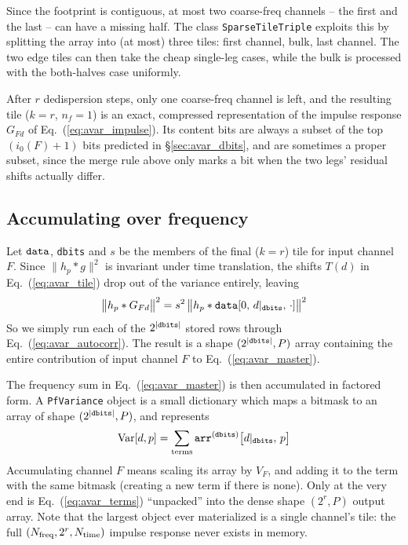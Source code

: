\documentclass{article}
\numberwithin{equation}{section}   %
\begin{document}
Since the footprint is contiguous, at most two coarse-freq channels -- the first and the last --
can have a missing half. The class \verb|SparseTileTriple| exploits this by splitting the array
into (at most) three tiles: first channel, bulk, last channel. The two edge tiles can then take
the cheap single-leg cases, while the bulk is processed with the both-halves case uniformly.

After $r$ dedispersion steps, only one coarse-freq channel is left, and the resulting tile
($k=r$, $n_f=1$) is an exact, compressed representation of the impulse response $G_{Fd}$ of
Eq.\ (\ref{eq:avar_impulse}). Its content bits are always a subset of the top $(i_0(F)+1)$ bits
predicted in \S\ref{sec:avar_dbits}, and are sometimes a proper subset, since the merge rule above
only marks a bit when the two legs' residual shifts actually differ.

\subsection{Accumulating over frequency}
\label{sec:avar_pfvariance}

Let ${\tt data}$, {\tt dbits} and $s$ be the members of the final ($k=r$) tile for input channel
$F$. Since $\|h_p * g\|^2$ is invariant under time translation, the shifts $T(d)$ in
Eq.\ (\ref{eq:avar_tile}) drop out of the variance entirely, leaving
\begin{equation}
\big\| h_p * G_{Fd} \big\|^2 = s^2 \, \big\| h_p * {\tt data}[0, \, d|_{\tt dbits}, \, \cdot] \big\|^2
  \label{eq:avar_tile_variance}
\end{equation}
So we simply run each of the $2^{|{\tt dbits}|}$ stored rows through Eq.\ (\ref{eq:avar_autocorr}).
The result is a shape $(2^{|{\tt dbits}|}, P)$ array containing the entire contribution of input
channel $F$ to Eq.\ (\ref{eq:avar_master}).

The frequency sum in Eq.\ (\ref{eq:avar_master}) is then accumulated in factored form. A
\verb|PfVariance| object is a small dictionary which maps a bitmask to an array of shape
$(2^{|{\tt dbits}|}, P)$, and represents
\begin{equation}
{\rm Var}[d,p] = \sum_{\rm terms} {\tt arr}^{({\tt dbits})}\big[ d|_{\tt dbits}, \, p \big]
  \label{eq:avar_terms}
\end{equation}
Accumulating channel $F$ means scaling its array by $V_F$, and adding it to the term with the same
bitmask (creating a new term if there is none). Only at the very end is
Eq.\ (\ref{eq:avar_terms}) ``unpacked'' into the dense shape $(2^r,P)$ output array. Note that the
largest object ever materialized is a single channel's tile: the full
$(N_{\rm freq}, 2^r, N_{\rm time})$ impulse response never exists in memory.
\end{document}
